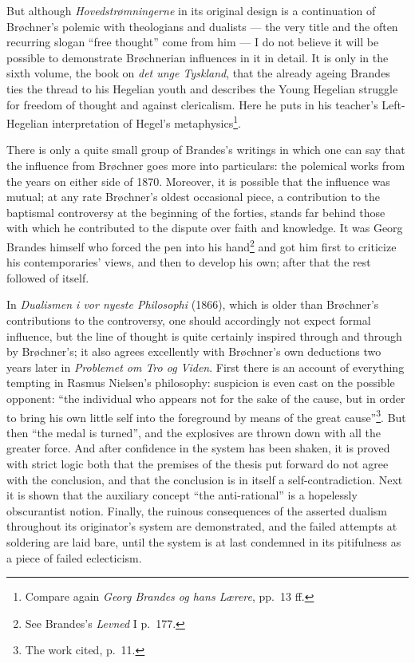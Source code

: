 \documentclass[12pt,a4paper,openany]{book}
\newcommand{\opage}[1]{\marginnote{\footnotesize\textit{[#1]}}}
\begin{document}
But although \textit{Hovedstrømningerne} in its original design is a continuation of Brøchner's polemic with
theologians and dualists --- the very title and the often recurring slogan ``free thought'' come from him --- I do
not believe it will be possible to demonstrate Brøchnerian influences in it in detail. It is only in the sixth
volume, the book on \textit{det unge Tyskland}, that the already ageing Brandes ties the thread to his Hegelian
youth and describes the Young Hegelian struggle for freedom of thought and against
\opage{159}\setcounter{footnote}{0}%
clericalism. Here he puts in his teacher's Left-Hegelian interpretation of Hegel's
metaphysics\footnote{Compare again \textit{Georg Brandes og hans Lærere}, pp.~13 ff.}.

There is only a quite small group of Brandes's writings in which one can say that the influence from Brøchner goes
more into particulars: the polemical works from the years on either side of 1870. Moreover, it is possible that the
influence was mutual; at any rate Brøchner's oldest occasional piece, a contribution to the baptismal controversy at
the beginning of the forties, stands far behind those with which he contributed to the dispute over faith and
knowledge. It was Georg Brandes himself who forced the pen into his hand\footnote{See Brandes's \textit{Levned} I
p.~177.} and got him first to criticize his contemporaries' views, and then to develop his own; after that the
rest followed of itself.

In \textit{Dualismen i vor nyeste Philosophi} (1866), which is older than Brøchner's contributions to the
controversy, one should accordingly not expect formal influence, but the line of thought is quite certainly
inspired through and through by Brøchner's; it also agrees excellently with Brøchner's own deductions two years
later in \textit{Problemet om Tro og Viden}. First there is an account of everything tempting in Rasmus Nielsen's
philosophy: suspicion is even cast on the possible opponent: ``the individual who appears not for the sake of the
cause, but in order to bring his own little self into the foreground by means of the great
cause''\footnote{The work cited, p.~11.}. But then ``the medal is turned'', and the explosives are thrown down
with all the greater force. And after confidence in the system has been shaken, it is proved with strict logic both
that the premises of the thesis put forward do not agree with the conclusion, and that the conclusion is in itself
a self-contradiction. Next it is shown that the auxiliary concept ``the anti-rational'' is a hopelessly
obscurantist notion. Finally, the ruinous consequences of the asserted dualism throughout its originator's system
are demonstrated, and the failed attempts at soldering are laid bare, until the system is at last condemned in its
pitifulness as a piece of failed eclecticism.
\end{document}
